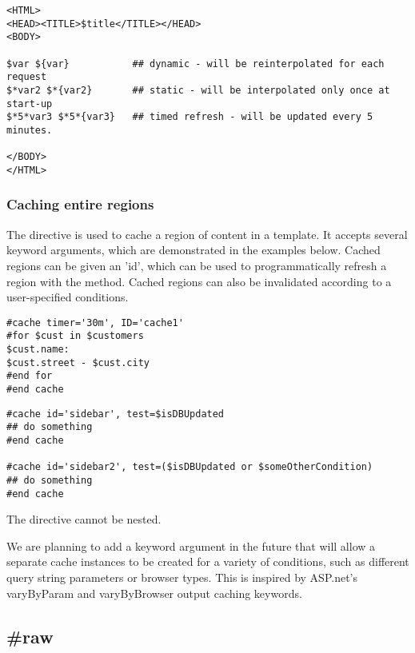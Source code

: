 \begin{verbatim}
<HTML>
<HEAD><TITLE>$title</TITLE></HEAD>
<BODY>

$var ${var}           ## dynamic - will be reinterpolated for each request
$*var2 $*{var2}       ## static - will be interpolated only once at start-up
$*5*var3 $*5*{var3}   ## timed refresh - will be updated every 5 minutes.

</BODY>
</HTML>
\end{verbatim}

\subsubsection{Caching entire regions}
\label{output.caching.regions}

The  directive is used to cache a region of content in a template.
It accepts several keyword arguments, which are demonstrated in the examples
below.  Cached regions can be given an 'id', which can be used to
programmatically refresh a region with the 
method.  Cached regions can also be invalidated according to a user-specified
 conditions.

\begin{verbatim}
#cache timer='30m', ID='cache1'
#for $cust in $customers
$cust.name:
$cust.street - $cust.city
#end for
#end cache
\end{verbatim}

\begin{verbatim}
#cache id='sidebar', test=$isDBUpdated
## do something
#end cache

#cache id='sidebar2', test=($isDBUpdated or $someOtherCondition)
## do something
#end cache
\end{verbatim}

The  directive cannot be nested.

We are planning to add a  keyword argument in the future that
will allow a separate cache instances to be created for a variety of conditions,
such as different query string parameters or browser types. This is inspired by
ASP.net's varyByParam and varyByBrowser output caching keywords.


\subsection{\#raw}
\label{directives.raw}

